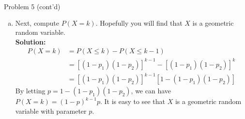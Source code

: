 \documentclass{beamer}
\begin{document}
\begin{frame}{Problem 5 (cont'd)}
    \begin{enumerate}[(c)]
        \item Next, compute $P(X = k)$. Hopefully you will find that $X$ is a geometric random variable.\\
        {\bf Solution:}
        \begin{align*}
        P(X=k) &= P(X\leq k)- P(X\leq k-1)\\
        & = \left[(1-p_1)(1-p_2)\right]^{k-1}-\left[(1-p_1)(1-p_2)\right]^k\\
        & = \left[(1-p_1)(1-p_2)\right]^{k-1}\left[1-(1-p_1)(1-p_2)\right]
        \end{align*}
        By letting $ p = 1-(1-p_1)(1-p_2)$, we can have $P(X=k) = (1-p)^{k-1}p$. It is easy to see that $X$ is a geometric random variable with parameter $p$.
    \end{enumerate}
\end{frame}
\end{document}
